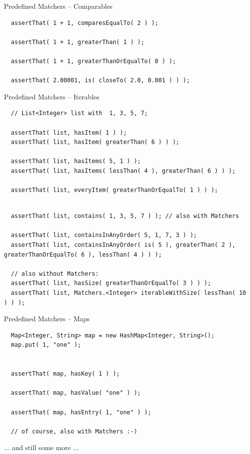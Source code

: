 \begin{frame}[fragile]{Predefined Matchers -- Comparables}
\begin{lstlisting}
  assertThat( 1 + 1, comparesEqualTo( 2 ) );

  assertThat( 1 + 1, greaterThan( 1 ) );

  assertThat( 1 + 1, greaterThanOrEqualTo( 0 ) );
  
  assertThat( 2.00001, is( closeTo( 2.0, 0.001 ) ) );
\end{lstlisting}
\end{frame}


\begin{frame}[fragile]{Predefined Matchers -- Iterables}
\begin{lstlisting}
  // List<Integer> list with  1, 3, 5, 7;
  
  assertThat( list, hasItem( 1 ) );
  assertThat( list, hasItem( greaterThan( 6 ) ) );
  
  assertThat( list, hasItems( 5, 1 ) );
  assertThat( list, hasItems( lessThan( 4 ), greaterThan( 6 ) ) );

  assertThat( list, everyItem( greaterThanOrEqualTo( 1 ) ) );
  
\end{lstlisting}


\begin{lstlisting}
  assertThat( list, contains( 1, 3, 5, 7 ) ); // also with Matchers
  
  assertThat( list, containsInAnyOrder( 5, 1, 7, 3 ) );
  assertThat( list, containsInAnyOrder( is( 5 ), greaterThan( 2 ), greaterThanOrEqualTo( 6 ), lessThan( 4 ) ) );

  // also without Matchers:
  assertThat( list, hasSize( greaterThanOrEqualTo( 3 ) ) );           
  assertThat( list, Matchers.<Integer> iterableWithSize( lessThan( 10 ) ) );
\end{lstlisting}

\end{frame}


\begin{frame}[fragile]{Predefined Matchers -- Maps}
\begin{lstlisting}
  Map<Integer, String> map = new HashMap<Integer, String>();
  map.put( 1, "one" );


  assertThat( map, hasKey( 1 ) );
  
  assertThat( map, hasValue( "one" ) );
  
  assertThat( map, hasEntry( 1, "one" ) );

  // of course, also with Matchers :-)
\end{lstlisting}

  \vspace{1cm}
  ... and still some more ...

\end{frame}


